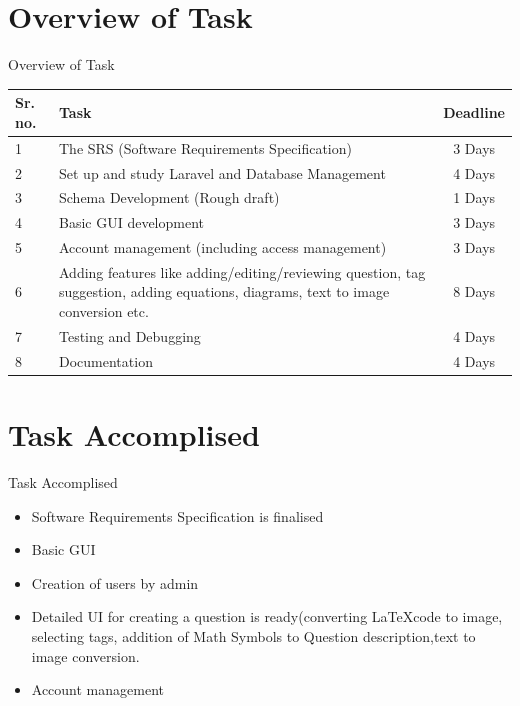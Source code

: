 \documentclass[10pt, a4paper]{beamer}
\begin{document}
\section{Overview of Task}
\begin{frame}{Overview of Task}

	\begin{tabular}{|p{7mm}|p{5cm}|c|}
		
		\hline
		\textbf{Sr. no.} & \textbf{Task} & \textbf{Deadline} \\
		
		\hline
		\scriptsize{1}&\scriptsize{The SRS (Software Requirements Specification)} & \scriptsize{3 Days}\\
		
		\hline
		\scriptsize{2}&\scriptsize{Set up and study Laravel and Database Management} & \scriptsize{4 Days}\\
		
		\hline
		\scriptsize{3}&\scriptsize{Schema Development (Rough draft)} & \scriptsize{1 Days}\\
		
		\hline
		\scriptsize{4}&\scriptsize{Basic GUI development} & \scriptsize{3 Days}\\	
		
		\hline
		\scriptsize{5}&\scriptsize{Account management (including access management) } & \scriptsize{3 Days}\\
		
		\hline
		\scriptsize{6}&\scriptsize{Adding   features   like   adding/editing/reviewing   question,   tag suggestion,   adding   equations,   diagrams,   text   to   image   conversion  
etc.  } & \scriptsize{8 Days}\\

		\hline
		\scriptsize{7}&\scriptsize{Testing and Debugging} & \scriptsize{4 Days}\\
		
		\hline		
		\scriptsize{8}&\scriptsize{Documentation} & \scriptsize{4 Days}\\	
		\hline	
	\end{tabular} 
\end{frame}

\section{Task Accomplised}
\begin{frame}{Task Accomplised}
	\begin{itemize}
		\item Software Requirements Specification is finalised
		\item Basic GUI
		\item Creation of users by admin
		\item Detailed UI for creating a question is ready(converting \LaTeX code to image, selecting tags, addition of Math Symbols to Question description,text to image conversion.
		\item Account management
	\end{itemize}
\end{frame}
\end{document}
